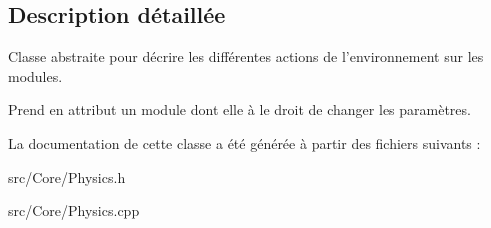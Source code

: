 \subsection{Description détaillée}
Classe abstraite pour décrire les différentes actions de l'environnement sur les modules. 

Prend en attribut un module dont elle à le droit de changer les paramètres. 

La documentation de cette classe a été générée à partir des fichiers suivants \-:\begin{DoxyCompactItemize}
\item 
src/\-Core/Physics.\-h\item 
src/\-Core/Physics.\-cpp\end{DoxyCompactItemize}
